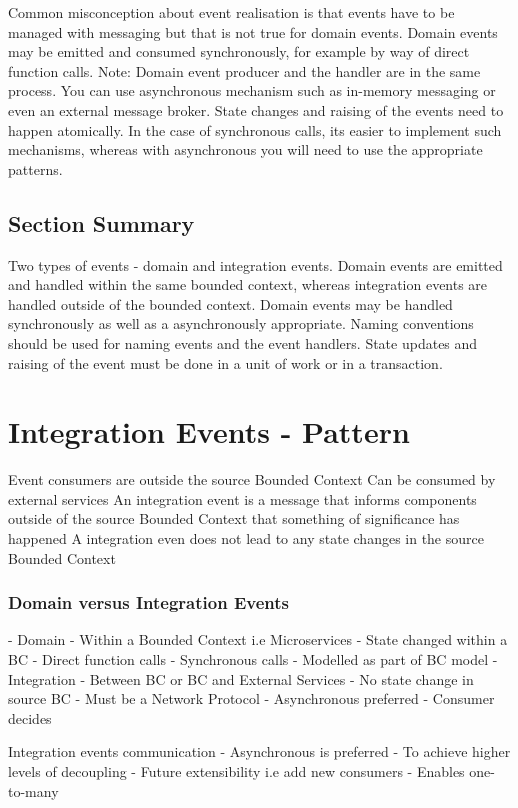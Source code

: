 \documentclass[a4paper, 11pt]{book}
\begin{document}
    Common misconception about event realisation is that events have to be managed with messaging but that is not true for domain events.
    Domain events may be emitted and consumed synchronously, for example by way of direct function calls.
    Note: Domain event producer and the handler are in the same process.
    You can use asynchronous mechanism such as in-memory messaging or even an external message broker.
    State changes and raising of the events need to happen atomically.
    In the case of synchronous calls, its easier to implement such mechanisms, whereas with asynchronous you will need to use the appropriate patterns.

    \subsection{Section Summary}
    Two types of events - domain and integration events.
    Domain events are emitted and handled within the same bounded context, whereas integration events are handled outside of the bounded context.
    Domain events may be handled synchronously as well as a asynchronously appropriate.
    Naming conventions should be used for naming events and the event handlers.
    State updates and raising of the event must be done in a unit of work or in a transaction.


    \section{Integration Events - Pattern}
    Event consumers are outside the source Bounded Context
    Can be consumed by external services
    An integration event is a message that informs components outside of the source Bounded Context that something of significance has happened
    A integration even does not lead to any state changes in the source Bounded Context

    \subsubsection{Domain versus Integration Events}
    - Domain
    - Within a Bounded Context i.e Microservices
    - State changed within a BC
    - Direct function calls
    - Synchronous calls
    - Modelled as part of BC model
    - Integration
    - Between BC or BC and External Services
    - No state change in source BC
    - Must be a Network Protocol
    - Asynchronous preferred
    - Consumer decides

    Integration events communication
    - Asynchronous is preferred
    - To achieve higher levels of decoupling
    - Future extensibility i.e add new consumers
    - Enables one-to-many
\end{document}
